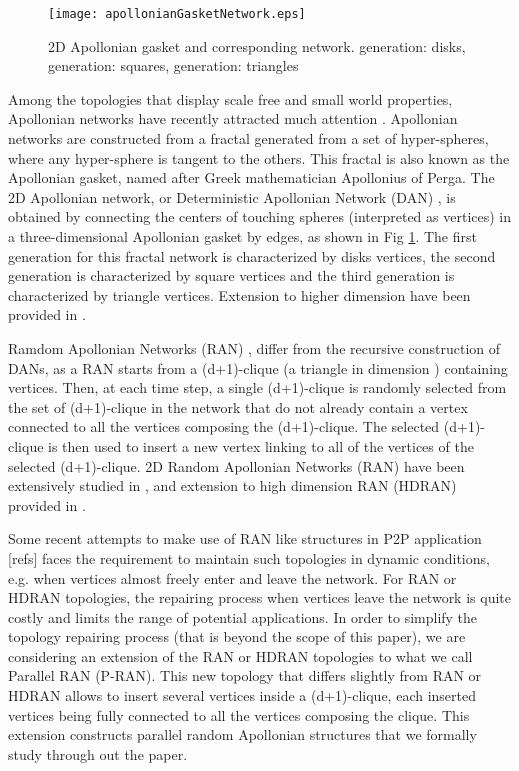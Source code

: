 \documentclass[11pt]{iopart}
\begin{document}
\begin{figure}[htbp]
\centering
\texttt{[image: apollonianGasketNetwork.eps]}
\caption{2D Apollonian gasket and corresponding network.  generation: disks,  generation: squares,  generation: triangles}
\label{apollonianGasketNetwork}
\end{figure}

Among the topologies that display scale free and small world properties, Apollonian networks \cite{PhysRevLett.94.018702} have recently attracted much attention \cite{pellegrini-2007,huang-2006-51}. Apollonian networks are constructed from a fractal generated from a set of hyper-spheres, where any hyper-sphere is tangent to the others. This fractal is also known as the Apollonian gasket, named after Greek mathematician Apollonius of Perga. The 2D Apollonian network, or Deterministic Apollonian Network (DAN) \cite{PhysRevLett.94.018702}, is obtained by connecting the centers of touching spheres (interpreted as vertices) in a three-dimensional Apollonian gasket by edges, as shown in Fig \ref{apollonianGasketNetwork}. The first generation for this fractal network is characterized by disks vertices, the second generation is characterized by square vertices and the third generation is characterized by triangle vertices. Extension to higher dimension have been provided in \cite{HDAN}.

Ramdom Apollonian Networks (RAN) \cite{zhou-2004}, differ from the recursive construction of DANs, as a RAN starts from a (d+1)-clique (a triangle in dimension ) containing  vertices. Then, at each time step, a single (d+1)-clique is randomly selected from the set of (d+1)-clique in the network that do not already contain a vertex connected to all the vertices composing the (d+1)-clique. The selected (d+1)-clique is then used to insert a new vertex linking to all of the  vertices of the selected (d+1)-clique. 2D Random Apollonian Networks (RAN) have been extensively studied in \cite{zhou-2004,zhang-2007-380}, and extension to high dimension RAN (HDRAN) provided in \cite{HDRAN}.

Some recent attempts to make use of RAN like structures in P2P application [refs] faces the requirement to maintain such topologies in dynamic conditions, e.g. when vertices almost freely enter and leave the network. For RAN or HDRAN topologies, the repairing process when vertices leave the network is quite costly and limits the range of potential applications. In order to simplify the topology repairing process (that is beyond the scope of this paper), we are considering an extension of the RAN or HDRAN topologies to what we call Parallel RAN (P-RAN). This new topology that differs slightly from RAN or HDRAN allows to insert several vertices inside a (d+1)-clique, each inserted vertices being fully connected to all the vertices composing the clique. This extension constructs parallel random Apollonian structures that we formally study through out the paper.
\end{document}
